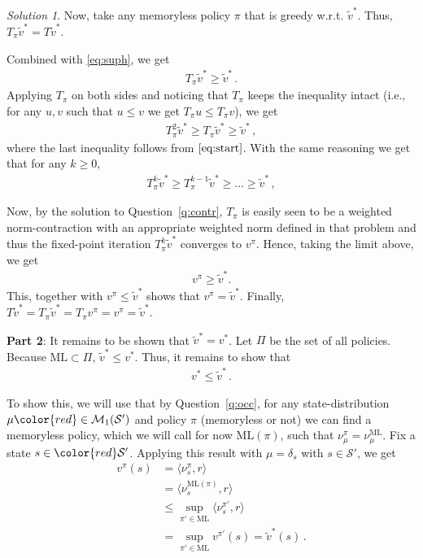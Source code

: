 \documentclass{article}
\DeclareMathOperator*{\1}{\mathbbm{1}}
\theoremstyle{definition}
\theoremstyle{remark}
\newtheorem*{solution*}{Solution}
\newcommand{\cS}{\mathcal{S}}
\begin{document}
\begin{solution*}
Now, take any memoryless policy $\pi$ that is greedy w.r.t. $\tilde{v}^*$. Thus, $T_\pi \tilde{v}^* = T \tilde{v}^*$.

Combined with \eqref{eq:suph}, we get
\begin{align}
\label{eq:start}
T_\pi \tilde{v}^* \ge \tilde{v}^*\,.
\end{align}
Applying $T_\pi$ on both sides and noticing that $T_\pi$ keeps the inequality intact (i.e., for any $u,v$ such that $u\le v$ we get $T_\pi u \le T_\pi v$), we get
\begin{align*}
T_\pi^2 \tilde{v}^* \ge T_\pi \tilde{v}^* \ge \tilde{v}^*\,,
\end{align*}
where the last inequality follows from $\eqref{eq:start}$. With the same reasoning we get that for any $k\ge 0$,
\begin{align*}
T_\pi^k \tilde{v}^* \ge T_\pi^{k-1} \tilde{v}^* \ge \dots \ge \tilde{v}^*\,,
\end{align*}

Now, 
{\color{red} by the solution to Question~\ref{q:contr}, $T_\pi$ is easily seen to be a weighted norm-contraction with an appropriate weighted norm defined in that problem and thus}
the fixed-point iteration $T_\pi^k \tilde{v}^*$ converges to $v^\pi$. 
Hence, taking the limit above, we get
\begin{align*}
v^\pi \ge \tilde{v}^*.
\end{align*}
This, together with $v^\pi \le \tilde{v}^*$ shows that $v^\pi = \tilde{v}^*$.
Finally, $T \tilde{v}^* = T_\pi \tilde{v}^* = T_\pi v^\pi = v^\pi = \tilde{v}^*$.

\noindent \textbf{Part 2}:
It remains to be shown that $\tilde{v}^* = v^*$.
Let $\Pi$ be the set of all policies.
Because $\text{ML}\subset \Pi$, $\tilde{v}^*\le v^*$.
Thus, it remains to show
that
\begin{align}
\label{eq:mlbigger}
v^* \le \tilde{v}^*\,.
\end{align}

To show this, we will use 
{\color{red} that by Question~\ref{q:occ},}
for any state-distribution $\mu {\color{red} \in \cM_1(\cS')}$ and policy $\pi$ (memoryless or not) we can find a memoryless policy, which we will call for now $\text{ML}(\pi)$, such that $\nu_\mu^\pi = \nu_\mu^{\text{ML}}$. Fix a state $s\in {\color{red} \cS'}$. 
Applying this result with $\mu = \delta_s$ {\color{red} with $s\in \cS'$}, we get
\begin{align*}
v^\pi(s)
& = \langle \nu_s^\pi, r \rangle \\
& = \langle \nu_s^{\text{ML}(\pi)}, r \rangle \\
& \le \sup_{\pi'\in \text{ML}} \langle \nu_s^{\pi'}, r \rangle \\
& = \sup_{\pi'\in \text{ML}} v^{\pi'}(s) = \tilde{v}^*(s)\,.
\end{align*}


\end{solution*}
\end{document}
